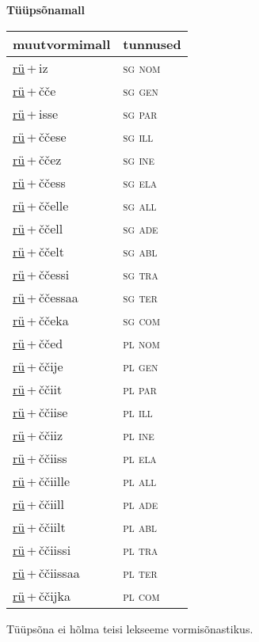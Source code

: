 
\vspace{1.8em}
\begin{minipage}{\textwidth}
\textbf{Tüüpsõnamall \,}\\

\begin{sideways}
\begin{tabular}{l l}
muutvormimall & tunnused \\
\hline
\underline{rü}\,+\,iz & \textsc{ sg nom } \\
\underline{rü}\,+\,čče & \textsc{ sg gen } \\
\underline{rü}\,+\,isse & \textsc{ sg par } \\
\underline{rü}\,+\,ččese & \textsc{ sg ill } \\
\underline{rü}\,+\,ččez & \textsc{ sg ine } \\
\underline{rü}\,+\,ččess & \textsc{ sg ela } \\
\underline{rü}\,+\,ččelle & \textsc{ sg all } \\
\underline{rü}\,+\,ččell & \textsc{ sg ade } \\
\underline{rü}\,+\,ččelt & \textsc{ sg abl } \\
\underline{rü}\,+\,ččessi & \textsc{ sg tra } \\
\underline{rü}\,+\,ččessaa & \textsc{ sg ter } \\
\underline{rü}\,+\,ččeka & \textsc{ sg com } \\
\underline{rü}\,+\,ččed & \textsc{ pl nom } \\
\underline{rü}\,+\,ččije & \textsc{ pl gen } \\
\underline{rü}\,+\,ččiit & \textsc{ pl par } \\
\underline{rü}\,+\,ččiise & \textsc{ pl ill } \\
\underline{rü}\,+\,ččiiz & \textsc{ pl ine } \\
\underline{rü}\,+\,ččiiss & \textsc{ pl ela } \\
\underline{rü}\,+\,ččiille & \textsc{ pl all } \\
\underline{rü}\,+\,ččiill & \textsc{ pl ade } \\
\underline{rü}\,+\,ččiilt & \textsc{ pl abl } \\
\underline{rü}\,+\,ččiissi & \textsc{ pl tra } \\
\underline{rü}\,+\,ččiissaa & \textsc{ pl ter } \\
\underline{rü}\,+\,ččijka & \textsc{ pl com } \\
\end{tabular}
\end{sideways}
\label{tab:tüüpsõnamall-rüiz}

\end{minipage}

 
\vspace{1em}
\noindent Tüüpsõna ei hõlma teisi lekseeme vormi\-sõnastikus.
